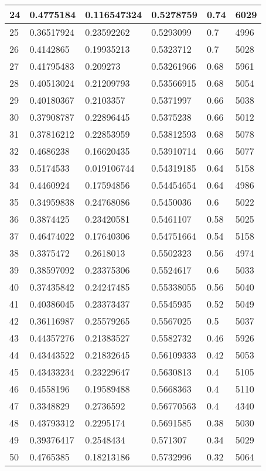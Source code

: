 \begin{longtable}{|l|l|l|l|l|l|}
24 & 0.4775184 & 0.116547324 & 0.5278759 & 0.74 & 6029 \\ \hline 
25 & 0.36517924 & 0.23592262 & 0.5293099 & 0.7 & 4996 \\ \hline 
26 & 0.4142865 & 0.19935213 & 0.5323712 & 0.7 & 5028 \\ \hline 
27 & 0.41795483 & 0.209273 & 0.53261966 & 0.68 & 5961 \\ \hline 
28 & 0.40513024 & 0.21209793 & 0.53566915 & 0.68 & 5054 \\ \hline 
29 & 0.40180367 & 0.2103357 & 0.5371997 & 0.66 & 5038 \\ \hline 
30 & 0.37908787 & 0.22896445 & 0.5375238 & 0.66 & 5012 \\ \hline 
31 & 0.37816212 & 0.22853959 & 0.53812593 & 0.68 & 5078 \\ \hline 
32 & 0.4686238 & 0.16620435 & 0.53910714 & 0.66 & 5077 \\ \hline 
33 & 0.5174533 & 0.019106744 & 0.54319185 & 0.64 & 5158 \\ \hline 
34 & 0.4460924 & 0.17594856 & 0.54454654 & 0.64 & 4986 \\ \hline 
35 & 0.34959838 & 0.24768086 & 0.5450036 & 0.6 & 5022 \\ \hline 
36 & 0.3874425 & 0.23420581 & 0.5461107 & 0.58 & 5025 \\ \hline 
37 & 0.46474022 & 0.17640306 & 0.54751664 & 0.54 & 5158 \\ \hline 
38 & 0.3375472 & 0.2618013 & 0.5502323 & 0.56 & 4974 \\ \hline 
39 & 0.38597092 & 0.23375306 & 0.5524617 & 0.6 & 5033 \\ \hline 
40 & 0.37435842 & 0.24247485 & 0.55338055 & 0.56 & 5040 \\ \hline 
41 & 0.40386045 & 0.23373437 & 0.5545935 & 0.52 & 5049 \\ \hline 
42 & 0.36116987 & 0.25579265 & 0.5567025 & 0.5 & 5037 \\ \hline 
43 & 0.44357276 & 0.21383527 & 0.5582732 & 0.46 & 5926 \\ \hline 
44 & 0.43443522 & 0.21832645 & 0.56109333 & 0.42 & 5053 \\ \hline 
45 & 0.43433234 & 0.23229647 & 0.5630813 & 0.4 & 5105 \\ \hline 
46 & 0.4558196 & 0.19589488 & 0.5668363 & 0.4 & 5110 \\ \hline 
47 & 0.3348829 & 0.2736592 & 0.56770563 & 0.4 & 4340 \\ \hline 
48 & 0.43793312 & 0.2295174 & 0.5691585 & 0.38 & 5030 \\ \hline 
49 & 0.39376417 & 0.2548434 & 0.571307 & 0.34 & 5029 \\ \hline 
50 & 0.4765385 & 0.18213186 & 0.5732996 & 0.32 & 5064 \\ \hline 
\end{longtable}